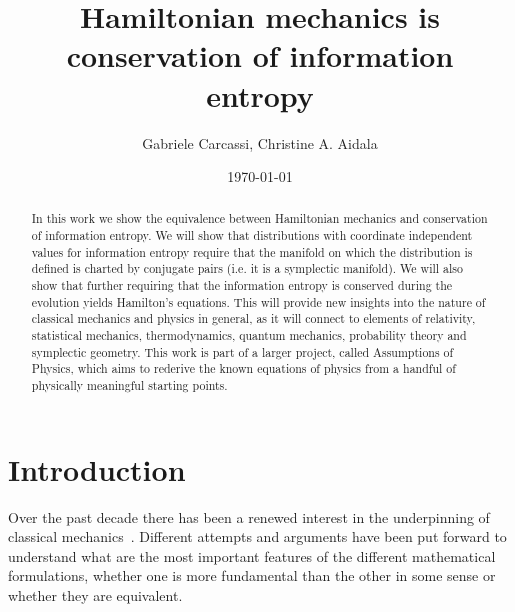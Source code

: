 \documentclass[11pt]{article}
\begin{document}
\title{Hamiltonian mechanics is conservation of information entropy}
\author{Gabriele Carcassi, Christine A. Aidala}



\date{\today}

\maketitle

\begin{abstract}
	In this work we show the equivalence between Hamiltonian mechanics and conservation of information entropy. We will show that distributions with coordinate independent values for information entropy require that the manifold on which the distribution is defined is charted by conjugate pairs (i.e. it is a symplectic manifold). We will also show that further requiring that the information entropy is conserved during the evolution yields Hamilton's equations. This will provide new insights into the nature of classical mechanics and physics in general, as it will connect to elements of relativity, statistical mechanics, thermodynamics, quantum mechanics, probability theory and symplectic geometry. This work is part of a larger project, called Assumptions of Physics, which aims to rederive the known equations of physics from a handful of physically meaningful starting points.
\end{abstract}

\tableofcontents
\newpage

\section{Introduction}

Over the past decade there has been a renewed interest in the underpinning of classical mechanics~\cite{North,Curiel,Barrett1,Barrett2}. Different attempts and arguments have been put forward to understand what are the most important features of the different mathematical formulations, whether one is more fundamental than the other in some sense or whether they are equivalent.
\end{document}

